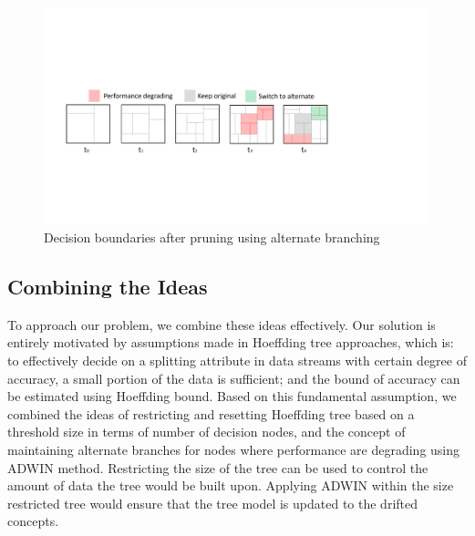 \begin{figure}[htbp]
    \begin{center}
        \includegraphics[width=14.0cm]{figs/prunedb.pdf}
        \caption{Decision boundaries after pruning using alternate branching}
        \label{fig:algo:prunedb}
    \end{center}
\end{figure}

\subsection{Combining the Ideas}
To approach our problem, we combine these ideas effectively. Our solution is entirely motivated by assumptions made in Hoeffding tree approaches, which is: to effectively decide on a splitting attribute in data streams with certain degree of accuracy, a small portion of the data is  sufficient; and the bound of accuracy can be estimated using Hoeffding bound. Based on this fundamental assumption, we combined the ideas of restricting and resetting Hoeffding tree based on a threshold size in terms of number of decision nodes, and the concept of maintaining alternate branches for nodes where performance are degrading using ADWIN method. Restricting the size of the tree can be used to control the amount of data the tree would be built upon. Applying ADWIN within the size restricted tree would ensure that the tree model is updated to the drifted concepts. 


